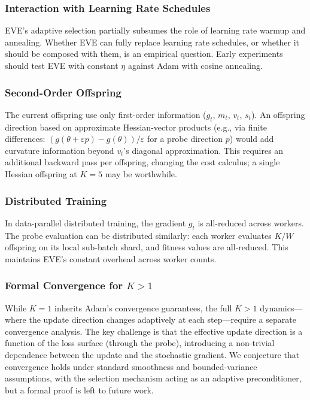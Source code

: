 \documentclass[12pt]{article}
\begin{document}
\subsubsection{Interaction with Learning Rate Schedules}

EVE's adaptive selection partially subsumes the role of learning rate
warmup and annealing.
Whether EVE can fully replace learning rate schedules, or whether it
should be composed with them, is an empirical question.
Early experiments should test EVE with constant $\eta$ against
Adam with cosine annealing.

\subsubsection{Second-Order Offspring}

The current offspring use only first-order information ($g_t$, $m_t$,
$v_t$, $s_t$).
An offspring direction based on approximate Hessian-vector products
(e.g., via finite differences: $(g(\theta + \varepsilon p) - g(\theta))
/ \varepsilon$ for a probe direction $p$) would add curvature
information beyond $v_t$'s diagonal approximation.
This requires an additional backward pass per offspring, changing the
cost calculus; a single Hessian offspring at $K = 5$ may be worthwhile.

\subsubsection{Distributed Training}

In data-parallel distributed training, the gradient $g_t$ is
all-reduced across workers.
The probe evaluation can be distributed similarly: each worker
evaluates $K / W$ offspring on its local sub-batch shard, and
fitness values are all-reduced.
This maintains EVE's constant overhead across worker counts.

\subsubsection{Formal Convergence for $K > 1$}

While $K = 1$ inherits Adam's convergence guarantees, the full
$K > 1$ dynamics---where the update direction changes adaptively
at each step---require a separate convergence analysis.
The key challenge is that the effective update direction is a function
of the loss surface (through the probe), introducing a non-trivial
dependence between the update and the stochastic gradient.
We conjecture that convergence holds under standard smoothness and
bounded-variance assumptions, with the selection mechanism acting
as an adaptive preconditioner, but a formal proof is left to future
work.
\end{document}
